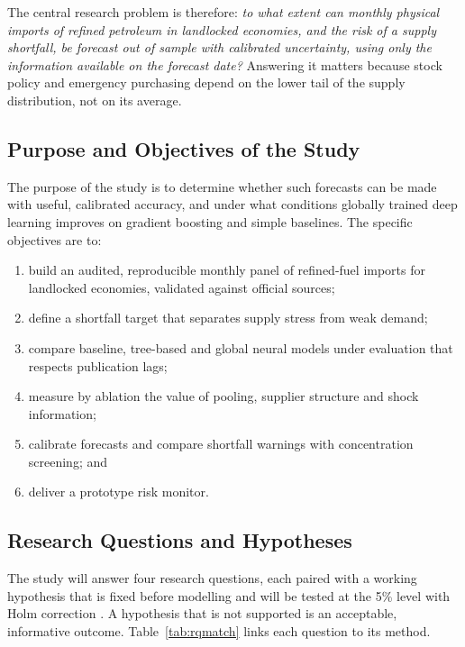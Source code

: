 \documentclass[conference]{IEEEtran}
\begin{document}
The central research problem is therefore: \emph{to what extent can monthly physical imports of refined petroleum in landlocked economies, and the risk of a supply shortfall, be forecast out of sample with calibrated uncertainty, using only the information available on the forecast date?} Answering it matters because stock policy and emergency purchasing depend on the lower tail of the supply distribution, not on its average.

\subsection{Purpose and Objectives of the Study}
The purpose of the study is to determine whether such forecasts can be made with useful, calibrated accuracy, and under what conditions globally trained deep learning improves on gradient boosting and simple baselines. The specific objectives are to:
\begin{enumerate}
\item build an audited, reproducible monthly panel of refined-fuel imports for landlocked economies, validated against official sources;
\item define a shortfall target that separates supply stress from weak demand;
\item compare baseline, tree-based and global neural models under evaluation that respects publication lags;
\item measure by ablation the value of pooling, supplier structure and shock information;
\item calibrate forecasts and compare shortfall warnings with concentration screening; and
\item deliver a prototype risk monitor.
\end{enumerate}

\subsection{Research Questions and Hypotheses}
The study will answer four research questions, each paired with a working hypothesis that is fixed before modelling and will be tested at the 5\% level with Holm correction \cite{holm1979}. A hypothesis that is not supported is an acceptable, informative outcome. Table~\ref{tab:rqmatch} links each question to its method.
\end{document}
